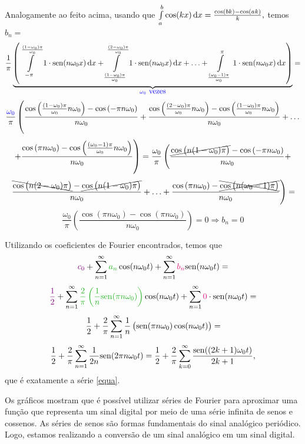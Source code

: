 \documentclass[11pt,twoside,a4paper]{book}
\begin{document}
Analogamente ao feito acima, usando que $\int\limits_a^b \cos(kx) \dif x = \frac{\cos(bk) - \cos(ak)}{k},$ temos $b_n=$
\[
\frac{1}{\pi} \underbrace{\left(\int\limits_{-\pi}^{\frac{(1 - \omega_0) \pi}{\omega_0}} 1\cdot \sen(n \omega_0 x) \dif {x} + \int\limits_{\frac{(1 - \omega_0) \pi}{\omega_0}}^{\frac{(2 - \omega_0) \pi}{\omega_0}} 1 \cdot\sen(n \omega_0 x) \dif {x} + \ldots + \int\limits_{\frac{(\omega_0 - 1) \pi}{\omega_0}}^{\pi} 1 \cdot \sen(n \omega_0 x) \dif {x} \right)}_{\textcolor{blue}{\omega_0 \ \mbox{vezes} } } =
\]
\[
\frac{\textcolor{blue}{\omega_0}}{\pi} \left( \frac{\cos\left(\frac{(1 - \omega_0) \pi}{\omega_0}  n \omega_0\right) - \cos\left(- \pi  n \omega_0\right)}{n \omega_0}  +  
\frac{\cos\left(\frac{(2 - \omega_0) \pi}{\omega_0}  n \omega_0\right) - \cos\left(\frac{(1 - \omega_0) \pi}{\omega_0}   n \omega_0\right)}{n \omega_0}  + \ldots \right.\]\[\left. + \frac{\cos\left(\pi  n \omega_0\right) - \cos\left(\frac{(\omega_0 - 1) \pi}{\omega_0}   n \omega_0\right)}{n \omega_0}    \right) =
\frac{\omega_0}{\pi} \left( \frac{ \cancel{\cos\left(n(1 - \omega_0) \pi \right)} - \cos\left(- \pi  n \omega_0\right)}{n \omega_0}  +  \right.\]\[ \left.
\frac{\bcancel{\cos\left(  n(2 - \omega_0) \pi \right)} - \cancel{\cos\left(n(1 - \omega_0) \pi\right)}}{n \omega_0}  + \ldots + \frac{\cos\left(\pi  n \omega_0\right) - \xcancel{\cos\left(n(\omega_0 - 1) \pi \right) }}{n \omega_0} \right) =
\]
\[
\frac{\omega_0}{\pi} \left(\frac{\cos( \pi n \omega_0) - \cos( \pi n \omega_0)}{n \omega_0} \right) = 0 \Rightarrow \boxed{b_n = 0}
\]

Utilizando os coeficientes de Fourier encontrados, temos que
\[
\textcolor{violet}{c_0} + \sum\limits_{n = 1}^\infty \textcolor{Verde}{a_n} \cos(n \omega_0 t) + \sum\limits_{n = 1}^\infty \textcolor{Rosa}{b_n} \sen(n \omega_0 t)  =
\]
\[
\textcolor{violet}{\frac{1}{2}} + \sum\limits_{n = 1}^\infty \textcolor{Verde}{\frac{2}{\pi} \left(\frac{1}{n} \sen( \pi n \omega_0)\right) } \cos(n \omega_0 t) + \sum\limits_{n = 1}^\infty \textcolor{Rosa}{0} \cdot \sen(n \omega_0 t)  = 
\]
\[
\frac{1}{2} + \frac{2}{\pi} \sum\limits_{n = 1}^\infty \frac{1}{n} \left( {\rm sen}( \pi n \omega_0) \cos(n \omega_0 t) \right) =
\]
\[
\frac{1}{2} + \frac{2}{\pi} \sum\limits_{n = 1}^\infty \frac{1}{2n}  {\rm sen}( 2 \pi n \omega_0 t ) = \frac{1}{2} + \frac{2}{\pi} \sum\limits_{k = 0}^\infty \frac{{\rm sen}( (2k+1) \omega_0 t) }{2k+1},
\]
que é exatamente a série \ref{equa}.

Os gráficos mostram que é possível utilizar séries de Fourier para aproximar uma função que representa um sinal digital por meio de uma série infinita de senos e cossenos. As séries de senos são formas fundamentais do sinal analógico periódico. Logo, estamos realizando a conversão de um sinal analógico em um sinal digital.
\end{document}
